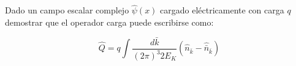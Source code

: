 Dado un campo escalar complejo ${\hat{\psi}}({x})$ cargado eléctricamente con carga $q$ demostrar que el operador carga puede escribirse como:

$$
\hat{Q}=q \int \frac{d \bar{k}}{(2 \pi)^{3} 2 E_{K}}\left(\hat{n}_{\bar{k}}-\hat{\bar{n}}_{\bar{k}}\right)
$$

\begin{solution}\ \\

\end{solution}